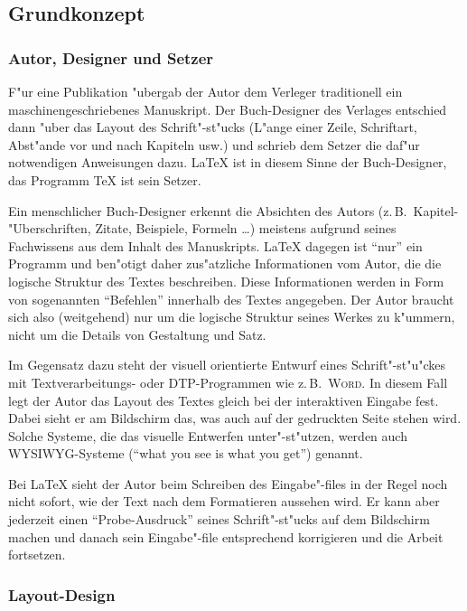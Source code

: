 \subsection{Grundkonzept}
 
\subsubsection{Autor, Designer und Setzer}
 
F"ur eine Publikation "ubergab der Autor dem Verleger
traditionell  ein maschinengeschriebenes Manuskript.  Der
Buch-Designer des Verlages entschied dann "uber das Layout des
Schrift"-st"ucks (L"ange einer Zeile, Schriftart, Ab\-st"ande vor
und nach Kapiteln usw.\@) und schrieb dem Setzer die
daf"ur notwendigen Anweisungen dazu.
\LaTeX{} ist in diesem Sinne der Buch-Designer, 
das Programm \TeX{} ist sein Setzer.
 
Ein menschlicher Buch-Designer erkennt die Absichten des Autors
(z.\,B.\ Kapitel-"Uberschriften, Zitate, Beispiele, Formeln
\dots) meistens aufgrund seines Fachwissens aus dem Inhalt des
Manuskripts.  \LaTeX{} dagegen ist "`nur"' ein Programm und
ben"otigt daher zus"atzliche Informationen vom Autor, die die
logische Struktur des Textes beschreiben.
Diese Informationen werden in Form von sogenannten "`Befehlen"'
innerhalb des Textes angegeben.
Der Autor braucht sich also
(weitgehend) nur um die logische Struktur seines Werkes zu k"ummern,
nicht um die Details von Gestaltung und Satz.
 
Im Gegensatz dazu steht der visuell orientierte Entwurf eines
Schrift"-st"u"ckes mit Textverarbeitungs- oder DTP-Programmen wie z.\,B.\ 
\textsc{Word}.
In diesem Fall legt der Autor das Layout des Textes gleich bei der
interaktiven Eingabe fest. Dabei sieht er am Bildschirm das, was
auch auf der gedruckten Seite stehen wird. Solche Systeme, die das
visuelle Entwerfen unter"-st"utzen, werden auch WYSIWYG-Systeme
("`what you see is what you get"') genannt.
 
Bei \LaTeX{} sieht der Autor beim Schreiben des Eingabe"-files in
der Regel noch nicht sofort, wie der Text nach dem Formatieren 
aussehen wird. Er kann aber %
jederzeit einen "`Probe-Ausdruck"' seines Schrift"-st"ucks auf dem
Bildschirm machen und danach sein Eingabe"-file entsprechend 
korrigieren und die Arbeit fortsetzen.
 
 
\subsubsection{Layout-Design}
 
